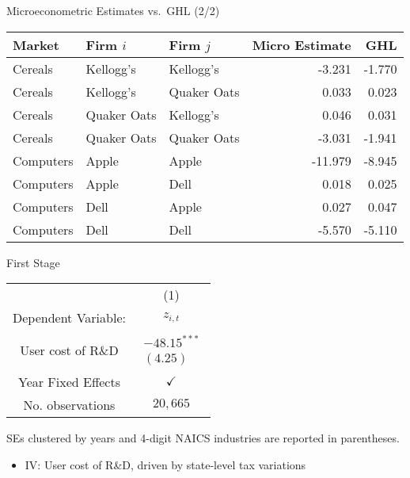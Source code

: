 \documentclass[
  10pt,               %
  aspectratio=169,     %
]{beamer}
\theoremstyle{plain}
\begin{document}
\begin{frame}[t]{Microeconometric Estimates vs.\ GHL \citep{Pellegrino2024-dn}  (2/2)}
  \begin{center}
    \begin{tabular}{lllrr}
      \toprule
      Market    & Firm $i$    & Firm $j$    & Micro Estimate & GHL    \\
      \midrule
      Cereals   & Kellogg's   & Kellogg's   & -3.231         & -1.770 \\
      Cereals   & Kellogg's   & Quaker Oats & 0.033          & 0.023  \\
      Cereals   & Quaker Oats & Kellogg's   & 0.046          & 0.031  \\
      Cereals   & Quaker Oats & Quaker Oats & -3.031         & -1.941 \\
      \addlinespace
      Computers & Apple       & Apple       & -11.979        & -8.945 \\
      Computers & Apple       & Dell        & 0.018          & 0.025  \\
      Computers & Dell        & Apple       & 0.027          & 0.047  \\
      Computers & Dell        & Dell        & -5.570         & -5.110 \\
      \bottomrule
    \end{tabular}
  \end{center}

  \hyperlink{product_identification}{}
\end{frame}

\begin{frame}{First Stage}
  \begin{center}
    \label{first_stage}
    \begin{tabular}{cc}
      \hline
      \hline              & (1)\tabularnewline
      Dependent Variable: & $z_{i,t}$\tabularnewline
      \hline
      User cost of R\&D   & $\begin{array}{c}
                                 -48.15^{***} \\
                                 (4.25)
                               \end{array}$\tabularnewline
      \hline
      Year Fixed Effects  & $\checkmark$\tabularnewline
      No. observations    & $20,665$\tabularnewline
      \hline
    \end{tabular}\medskip{}
    \par\end{center}

  {\footnotesize
  SEs clustered by years and 4-digit NAICS industries are reported in parentheses.
  }
  \medskip{}
  \begin{itemize}
    \item IV: User cost of R\&D, driven by state-level tax variations \citep{Wilson2009-ri,Bloom2013-pn}
  \end{itemize}
  \hyperlink{regression}{}
\end{frame}



\end{document}
